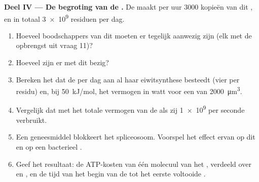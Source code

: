 \begin{problem}
\medskip
\noindent\textbf{Deel IV --- De begroting van de .}
De  maakt per uur \num{3000} kopieën van dit , en in totaal \num{3e9}
residuen  per dag.
\begin{enumerate}[resume]
  \item Hoeveel boodschappers van dit  moeten er tegelijk aanwezig zijn
        (elk met de opbrengst uit vraag 11)?
  \item Hoeveel  zijn er met dit  bezig?
  \item Bereken het  dat de  per dag aan al haar eiwitsynthese
        besteedt (vier per residu) en, bij \qty{50}{kJ/mol}, het vermogen
        in watt voor een  van \qty{2000}{\micro m^3}.
  \item Vergelijk dat met het totale vermogen van de  als zij
        \qty{1e9}{}  per seconde verbruikt.
  \item Een geneesmiddel blokkeert het spliceosoom. Voorspel het effect
        ervan op dit  en op een bacterieel .
  \item Geef het resultaat: de ATP-kosten van één molecuul van het ,
        verdeeld over  en , en de tijd van het begin
        van de  tot het eerste voltooide .
\end{enumerate}
\end{problem}
